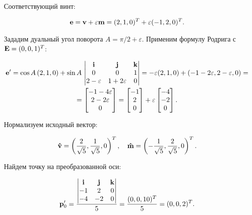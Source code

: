 Соответствующий винт:

\begin{equation*}
    \vb{e} = \vb{v} + \varepsilon \vb{m} = (2, 1, 0)^T + \varepsilon (-1, 2, 0)^T.
\end{equation*}

Зададим дуальный угол поворота $A = \pi/2 + \varepsilon$. Применим формулу Родрига с $\vb{E} = (0, 0, 1)^T$:

\begin{multline*}
    \vb{e}' = \cos A \, (2, 1, 0) + \sin A \, 
    \begin{vmatrix}
        \vb{i} & \vb{j} & \vb{k} \\
        0 & 0 & 1 \\
        2 - \varepsilon & 1 + 2\varepsilon & 0
    \end{vmatrix}
    = -\varepsilon (2, 1, 0) + ( -1 - 2\varepsilon, 2 - \varepsilon, 0) = \\
    = \begin{bmatrix}
        -1 - 4\varepsilon \\
        2 - 2\varepsilon \\
        0
    \end{bmatrix}
    = 
    \begin{bmatrix}
        -1 \\
        2 \\
        0
    \end{bmatrix}
    + \varepsilon 
    \begin{bmatrix}
        -4 \\
        -2 \\
        0
    \end{bmatrix}.
\end{multline*}

Нормализуем исходный вектор:

\begin{equation*}
    \vb{\hat{v}} = \left( \frac{2}{\sqrt{5}}, \frac{1}{\sqrt{5}}, 0 \right)^T, \quad
    \vb{\hat{m}} = \left( -\frac{1}{\sqrt{5}}, \frac{2}{\sqrt{5}}, 0 \right)^T.
\end{equation*}

Найдем точку на преобразованной оси:

\begin{equation*}
    \vb{p}'_0 = \frac{
    \begin{vmatrix}
        \vb{i} & \vb{j} & \vb{k} \\
        -1 & 2 & 0 \\
        -4 & -2 & 0
    \end{vmatrix}
    }{5} = \frac{(0, 0, 10)^T}{5} = (0, 0, 2)^T.
\end{equation*}



